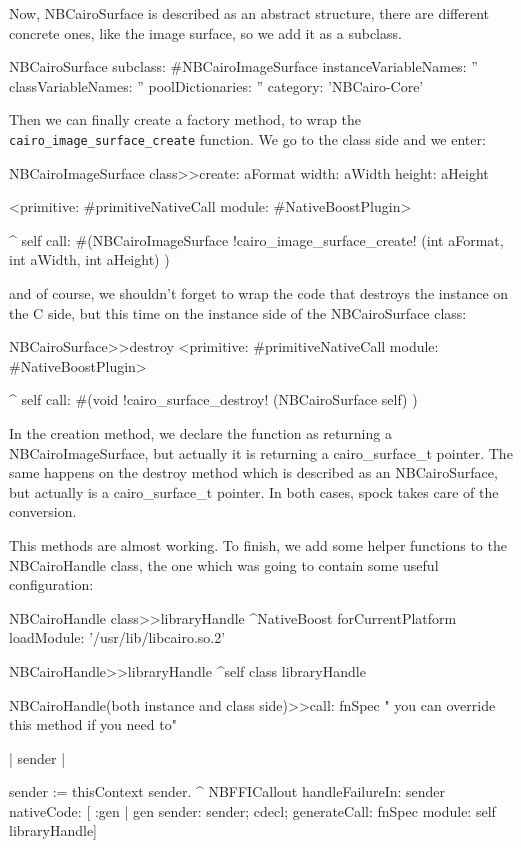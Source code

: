 \documentclass[a4paper,10pt,twoside]{book}
\begin{document}
Now, NBCairoSurface is described as an abstract structure, 
there are different concrete ones, like the image surface,
so we add it as a subclass.


\begin{classdef}{}
NBCairoSurface subclass: #NBCairoImageSurface
	instanceVariableNames: ''
	classVariableNames: ''
	poolDictionaries: ''
	category: 'NBCairo-Core'
\end{classdef}

Then we can finally create a factory method, to wrap the \verb|cairo_image_surface_create| function. We go to the class side and
we enter:

\begin{code}{}
NBCairoImageSurface class>>create: aFormat width: aWidth height: aHeight

	<primitive: #primitiveNativeCall module: #NativeBoostPlugin>
	
	^ self call: #(NBCairoImageSurface !cairo\_image\_surface\_create! (int aFormat,
                                                         int aWidth,
                                                         int aHeight) )
\end{code}

and of course, we shouldn't forget to wrap the code that destroys the instance on the C side, but this time on the instance side of the NBCairoSurface class:

\begin{code}{}
NBCairoSurface>>destroy
	<primitive: #primitiveNativeCall module: #NativeBoostPlugin>
	
	^ self call: #(void !cairo\_surface\_destroy! (NBCairoSurface self) )

\end{code}

In the creation method, we declare the function as returning a
NBCairoImageSurface, but actually it is returning a cairo\_surface\_t
pointer. The same happens on the destroy method which is described
as an NBCairoSurface, but actually is a cairo\_surface\_t pointer.
In both cases, spock takes care of the conversion.




This methods are almost working. To finish, we add some helper
functions to the NBCairoHandle class, the one which was going
to contain some useful configuration:

\begin{code}{}
NBCairoHandle class>>libraryHandle
	^NativeBoost forCurrentPlatform loadModule: '/usr/lib/libcairo.so.2'

NBCairoHandle>>libraryHandle
	^self class libraryHandle
	
NBCairoHandle(both instance and class side)>>call: fnSpec
	" you can override this method if you need to"

	| sender |
	
	sender := thisContext sender.
	^ NBFFICallout  
		handleFailureIn: sender
		nativeCode: [ :gen |
			gen
				sender: sender;
				cdecl;
				generateCall: fnSpec module: self libraryHandle]
\end{code}
\end{document}
